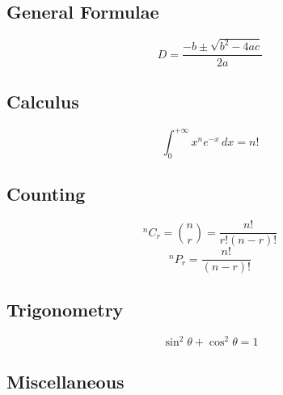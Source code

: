 \documentclass[a4paper,10pt,titlepage]{article}
\begin{document}
\subsection{General Formulae}

\[ D = \frac{-b \pm \sqrt{b^2 - 4ac}}{2a} \]


\subsection{Calculus}



\[ \int_0^{+\infty} x^n e^{-x} \,dx = n!\]

\subsection{Counting}

\[{^nC_r} = \binom{n}{r} = \frac{n!}{r!(n-r)!}\]
\[{^nP_r} = \frac{n!}{(n-r)!}\]

\subsection{Trigonometry}

\[\sin^2\theta + \cos^2\theta=1\]


\subsection{Miscellaneous}
\end{document}

